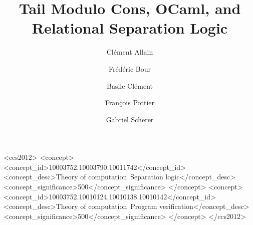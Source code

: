 \documentclass[acmsmall,screen,review,anonymous]{acmart}
\begin{document}

\title{Tail Modulo Cons, OCaml, and Relational Separation Logic}

\author{Clément Allain}

\author{Frédéric Bour}

\author{Basile Clément}

\author{François Pottier}

\author{Gabriel Scherer}

\begin{abstract}
    
\end{abstract}

\maketitle


\begin{CCSXML}
<ccs2012>
<concept>
<concept_id>10003752.10003790.10011742</concept_id>
<concept_desc>Theory of computation~Separation logic</concept_desc>
<concept_significance>500</concept_significance>
</concept>
<concept>
<concept_id>10003752.10010124.10010138.10010142</concept_id>
<concept_desc>Theory of computation~Program verification</concept_desc>
<concept_significance>500</concept_significance>
</concept>
</ccs2012>
\end{CCSXML}



\newcommand{\separate}{\FALSE}



\separate{\clearpage}{}


\separate{\clearpage}{}


\separate{\clearpage}{}

\end{document}
